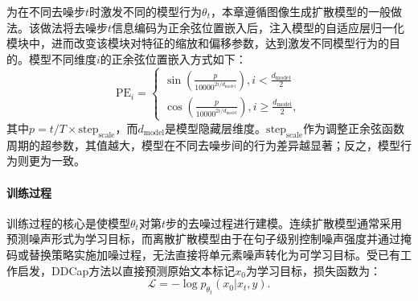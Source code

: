 为在不同去噪步$t$时激发不同的模型行为$\theta_t$，本章遵循图像生成扩散模型\cite{VQ-diffusion}的一般做法。该做法将去噪步$t$信息编码为正余弦位置嵌入后，注入模型的自适应层归一化模块\cite{adaln}中，进而改变该模块对特征的缩放和偏移参数，达到激发不同模型行为的目的。模型不同维度$i$的正余弦位置嵌入方式如下：
\begin{equation}
    \text{PE}_{i} = \begin{cases}
    \sin(\frac{p}{10000^{2i/d_{\text{model}}}}), i < \frac{d_{\text{model}}}{2} \\
    \cos(\frac{p}{10000^{2i/d_{\text{model}}}}), i \ge \frac{d_{\text{model}}}{2},
    \end{cases}
    \label{eq:ddcap-t}
\end{equation}
其中$p = t/T\times \text{step}_{\text{scale}}$，而$d_{\text{model}}$是模型隐藏层维度。$\text{step}_{\text{scale}}$作为调整正余弦函数周期的超参数，其值越大，模型在不同去噪步间的行为差异越显著；反之，模型行为则更为一致。

\paragraph{训练过程} 训练过程的核心是使模型$\theta_t$对第$t$步的去噪过程进行建模。连续扩散模型通常采用预测噪声形式为学习目标，而离散扩散模型由于在句子级别控制噪声强度并通过掩码或替换策略实施加噪过程，无法直接将单元素噪声转化为可学习目标。受已有工作\cite{structddm}启发，DDCap方法以直接预测原始文本标记$x_{0}$为学习目标，损失函数为：
\begin{equation}
\mathcal{L}=-\log p_{\theta_t}(x_0 | x_t, y).
\end{equation}

